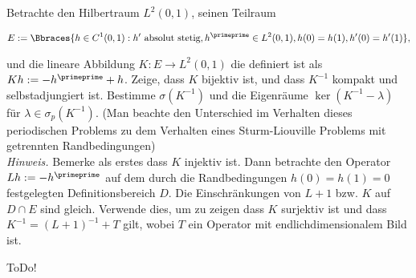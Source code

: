 \begin{exercise}[38/1*]

Betrachte den Hilbertraum $L^2(0, 1)$, seinen Teilraum

\begin{align*}
  E
  :=
  \Bbraces
  {
    h \in C^1(0, 1):
    h^\prime ~\text{absolut stetig},
    h^\primeprime \in L^2(0, 1),
    h(0) = h(1),
    h^\prime(0) = h^\prime(1)
  },
\end{align*}

und die lineare Abbildung $K: E \to L^2(0, 1)$ die definiert ist als $K h := -h^\primeprime + h$.
Zeige, dass $K$ bijektiv ist, und dass $K^{-1}$ kompakt und selbstadjungiert ist.
Bestimme $\sigma(K^{-1})$ und die Eigenräume $\ker{(K^{-1} - \lambda)}$ für $\lambda \in \sigma_p(K^{-1})$.
(Man beachte den Unterschied im Verhalten dieses periodischen Problems zu dem Verhalten eines Sturm-Liouville Problems mit getrennten Randbedingungen) \\

\textit{Hinweis.}
Bemerke als erstes dass $K$ injektiv ist.
Dann betrachte den Operator $L h := -h^\primeprime$ auf dem durch die Randbedingungen $h(0) = h(1) = 0$ festgelegten Definitionsbereich $D$.
Die Einschränkungen von $L + 1$ bzw. $K$ auf $D \cap E$ sind gleich.
Verwende dies, um zu zeigen dass $K$ surjektiv ist und dass $K^{-1}=(L+1)^{-1}+T$ gilt, wobei $T$ ein Operator mit endlichdimensionalem Bild ist.

\end{exercise}

\begin{solution}

ToDo!

\end{solution}
